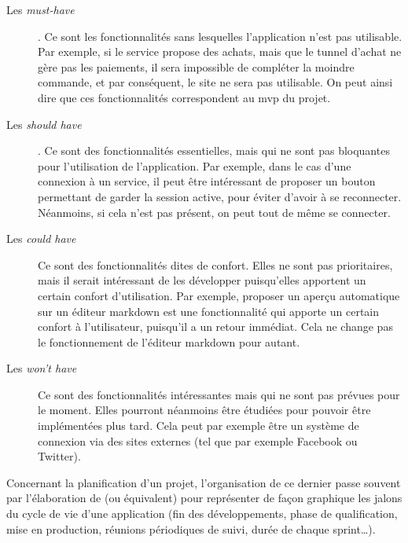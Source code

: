 \begin{description}
	\item [Les \emph{must-have}]. Ce sont les fonctionnalités sans lesquelles l'application n'est pas utilisable. Par exemple, si le service propose des achats, mais que le tunnel d'achat ne gère pas les paiements, il sera impossible de compléter la moindre commande, et par conséquent, le site ne sera pas utilisable. On peut ainsi dire que ces fonctionnalités correspondent au \gls{mvp} du projet.
	\item [Les \emph{should have}]. Ce sont des fonctionnalités essentielles, mais qui ne sont pas bloquantes pour l'utilisation de l'application. Par exemple, dans le cas d'une connexion à un service, il peut être intéressant de proposer un bouton permettant de garder la session active, pour éviter d'avoir à se reconnecter. Néanmoins, si cela n'est pas présent, on peut tout de même se connecter.
	\item [Les \emph{could have}] Ce sont des fonctionnalités dites de confort. Elles ne sont pas prioritaires, mais il serait intéressant de les développer puisqu'elles apportent un certain confort d'utilisation. Par exemple, proposer un aperçu automatique sur un éditeur \gls{markdown} est une fonctionnalité qui apporte un certain confort à l'utilisateur, puisqu'il a un retour immédiat. Cela ne change pas le fonctionnement de l'éditeur \gls{markdown} pour autant.
	\item [Les \emph{won't have}] Ce sont des fonctionnalités intéressantes mais qui ne sont pas prévues pour le moment. Elles pourront néanmoins être étudiées pour pouvoir être implémentées plus tard. Cela peut par exemple être un système de connexion via des sites externes (tel que par exemple Facebook ou Twitter).
\end{description}


Concernant la planification d'un projet, l'organisation de ce dernier passe souvent par l'élaboration de  (ou équivalent) pour représenter de façon graphique les jalons du cycle de vie d'une application (fin des développements, phase de qualification, mise en production, réunions périodiques de suivi, durée de chaque sprint\ldots).


